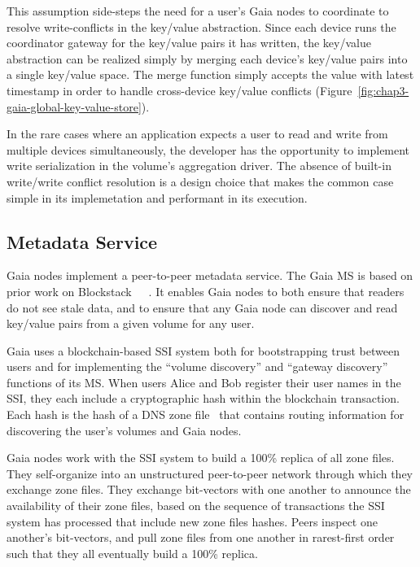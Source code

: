 This assumption side-steps the need for a user's Gaia nodes to
coordinate to resolve write-conflicts in the key/value abstraction.  Since each
device runs the coordinator gateway for the key/value pairs it has
written, the key/value abstraction can be realized simply by
merging each device's key/value pairs into a single key/value space.
The merge function simply accepts the
value with latest timestamp in order to handle cross-device
key/value conflicts (Figure~\ref{fig:chap3-gaia-global-key-value-store}).

In the rare cases where an application expects a user to read and write from
multiple devices simultaneously, the developer has the opportunity to implement
write serialization in the volume's aggregation driver.  The absence of built-in
write/write conflict resolution is a design choice that makes the common case
simple in its implemetation and performant in its execution. 

\subsection{Metadata Service}

Gaia nodes implement a peer-to-peer metadata service.  The Gaia MS is based on prior work
on Blockstack~\cite{blockstack}~\cite{virtualchain}~\cite{ali2017}.  It enables
Gaia nodes to both ensure that readers do not see stale data, and to ensure that
any Gaia node can discover and read key/value pairs from a given volume for any user.

Gaia uses a blockchain-based SSI system both for bootstrapping trust between
users and for implementing the ``volume discovery'' and ``gateway discovery''
functions of its MS.  When users Alice and Bob 
register their user names in the SSI, they each include a cryptographic hash within the
blockchain transaction.  Each hash is the hash of a DNS zone
file~\cite{rfc-zone-file} that contains routing information for discovering the
user's volumes and Gaia nodes.

Gaia nodes work with the SSI system to build a 100\% replica of all zone files.
They self-organize into an unstructured
peer-to-peer network through which they exchange zone files.  They exchange
bit-vectors with one another to announce the availability of their zone files,
based on the sequence of transactions the SSI system has processed that include
new zone files hashes.  Peers inspect one another's bit-vectors, and pull
zone files from one another in rarest-first order such that they all eventually
build a 100\% replica.

